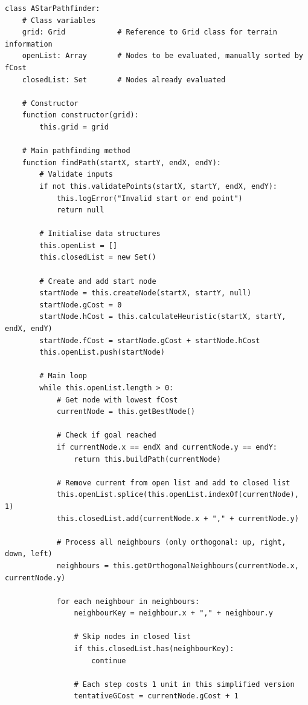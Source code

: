 \begin{verbatim}
class AStarPathfinder:
    # Class variables
    grid: Grid            # Reference to Grid class for terrain information
    openList: Array       # Nodes to be evaluated, manually sorted by fCost
    closedList: Set       # Nodes already evaluated
    
    # Constructor
    function constructor(grid):
        this.grid = grid
    
    # Main pathfinding method
    function findPath(startX, startY, endX, endY):
        # Validate inputs
        if not this.validatePoints(startX, startY, endX, endY):
            this.logError("Invalid start or end point")
            return null
        
        # Initialise data structures
        this.openList = []
        this.closedList = new Set()
        
        # Create and add start node
        startNode = this.createNode(startX, startY, null)
        startNode.gCost = 0
        startNode.hCost = this.calculateHeuristic(startX, startY, endX, endY)
        startNode.fCost = startNode.gCost + startNode.hCost
        this.openList.push(startNode)
        
        # Main loop
        while this.openList.length > 0:
            # Get node with lowest fCost
            currentNode = this.getBestNode()
            
            # Check if goal reached
            if currentNode.x == endX and currentNode.y == endY:
                return this.buildPath(currentNode)
            
            # Remove current from open list and add to closed list
            this.openList.splice(this.openList.indexOf(currentNode), 1)
            this.closedList.add(currentNode.x + "," + currentNode.y)
            
            # Process all neighbours (only orthogonal: up, right, down, left)
            neighbours = this.getOrthogonalNeighbours(currentNode.x, currentNode.y)
            
            for each neighbour in neighbours:
                neighbourKey = neighbour.x + "," + neighbour.y
                
                # Skip nodes in closed list
                if this.closedList.has(neighbourKey):
                    continue
                
                # Each step costs 1 unit in this simplified version
                tentativeGCost = currentNode.gCost + 1
                

\end{verbatim}

